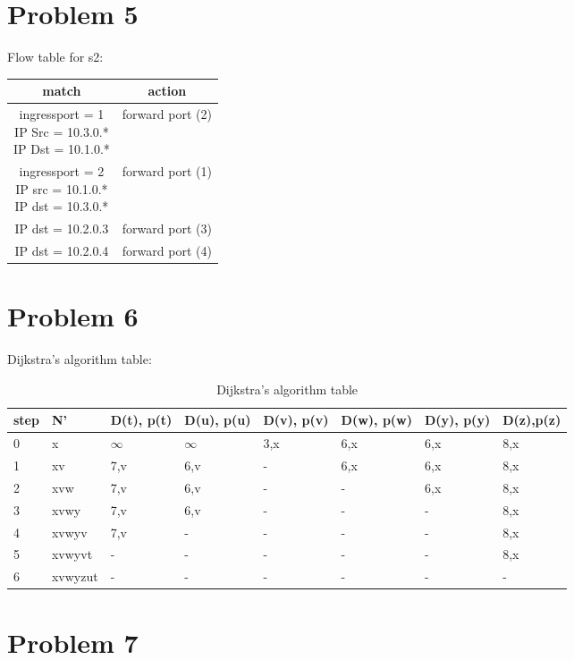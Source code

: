 \documentclass[12pt,a4paper]{article}
\begin{document}
\section*{Problem 5}
Flow table for s2:
\begin{table}[!ht]
    \centering
    \begin{tabular}{|c|c|}
    \hline
        match & action \\ \hline
        \makecell{ingressport = 1 \\ IP Src = 10.3.0.* \\ IP Dst = 10.1.0.*} & forward port (2) \\ \hline
        \makecell{ingressport = 2 \\ IP src = 10.1.0.* \\ IP dst = 10.3.0.*} & forward port (1) \\ \hline
        IP dst = 10.2.0.3 & forward port (3) \\ \hline
        IP dst = 10.2.0.4 & forward port (4) \\ \hline
    \end{tabular}
\end{table}

\section*{Problem 6}
Dijkstra's algorithm table:
\begin{table}[!ht]
    \centering
    \begin{tabular}{|l|l|l|l|l|l|l|l|}
    \hline
        step & N' & D(t), p(t) & D(u), p(u) & D(v), p(v) & D(w), p(w) & D(y), p(y) & D(z),p(z) \\ \hline
        0 & x & $\infty$ & $\infty$ & 3,x & 6,x & 6,x & 8,x \\ \hline
        1 & xv & 7,v & 6,v & - & 6,x & 6,x & 8,x \\ \hline
        2 & xvw & 7,v & 6,v & - & - & 6,x & 8,x \\ \hline
        3 & xvwy & 7,v & 6,v & - & - & - & 8,x \\ \hline
        4 & xvwyv & 7,v & - & - & - & - & 8,x \\ \hline
        5 & xvwyvt & - & - & - & - & - & 8,x \\ \hline
        6 & xvwyzut & - & - & - & - & - & - \\ \hline
    \end{tabular}
    \caption{Dijkstra's algorithm table}
\end{table}
\section*{Problem 7}
\end{document}
